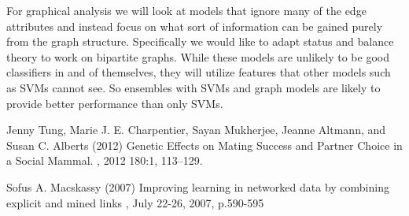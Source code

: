 \documentclass[twoside,twocolumn,paper=letter,fontsize=11pt]{article}
\begin{document}
For graphical analysis we will look at models that ignore many of the edge attributes and instead focus on what sort of information can be gained purely from the graph structure. Specifically we would like to adapt status and balance theory to work on bipartite graphs. While these models are unlikely to be good classifiers in and of themselves, they will utilize features that other models such as SVMs cannot see. So ensembles with SVMs and graph models are likely to provide better performance than only SVMs.


\begin{thebibliography}{99} %

  Jenny Tung, Marie J. E. Charpentier, Sayan Mukherjee, Jeanne Altmann, and Susan C. Alberts (2012)
\newblock 
  Genetic Effects on Mating Success and Partner Choice in a Social Mammal.
, 2012 180:1, 113--129.

Sofus A. Macskassy (2007) 
\newblock
Improving learning in networked data by combining explicit and mined links
, July 22-26, 2007, p.590-595
 
\end{thebibliography}

\end{document}
